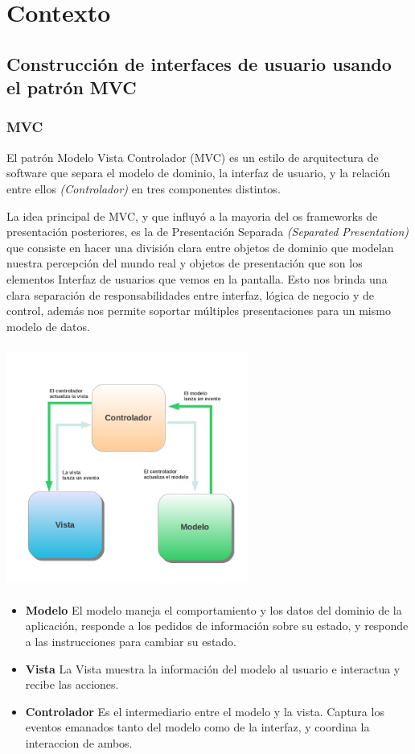 \section{Contexto}


\subsection{Construcción de interfaces de usuario usando el patrón MVC}
\subsubsection{MVC}

El patrón Modelo Vista Controlador (MVC) es un estilo de arquitectura de
software que separa el modelo de dominio, la interfaz de usuario,
y la relación entre ellos \emph{(Controlador)} en tres componentes distintos.
\cite{burbeck87}

La idea principal de MVC, y que influyó a la mayoria del os frameworks de
presentación posteriores, es la de Presentación Separada \emph{(Separated
Presentation)} que consiste en hacer una división clara entre objetos de 
dominio que modelan nuestra percepción del mundo real y objetos de presentación 
que son los elementos Interfaz de usuarios que vemos en la pantalla. 
Esto nos brinda una clara separación de responsabilidades entre interfaz,
lógica de negocio y de control, además nos permite soportar múltiples
presentaciones para un mismo modelo de datos. \cite{reenskaug79}
  
\includegraphics[width=300px, height=300px]{img/mvc}


\begin {itemize}

	\item {\bf Modelo}
		El modelo maneja el comportamiento y los datos del dominio de la aplicación,
		responde a los pedidos de información sobre su estado, 
		y responde a las instrucciones para cambiar su estado. 
		
		
	\item {\bf Vista}
		La Vista muestra la información del modelo al usuario e interactua y recibe
		las acciones.
		
	\item {\bf Controlador}
		Es el intermediario entre el modelo y la vista.
		Captura los eventos emanados tanto del modelo como de la interfaz, y coordina
		la interaccion de ambos.
		

\end {itemize}

